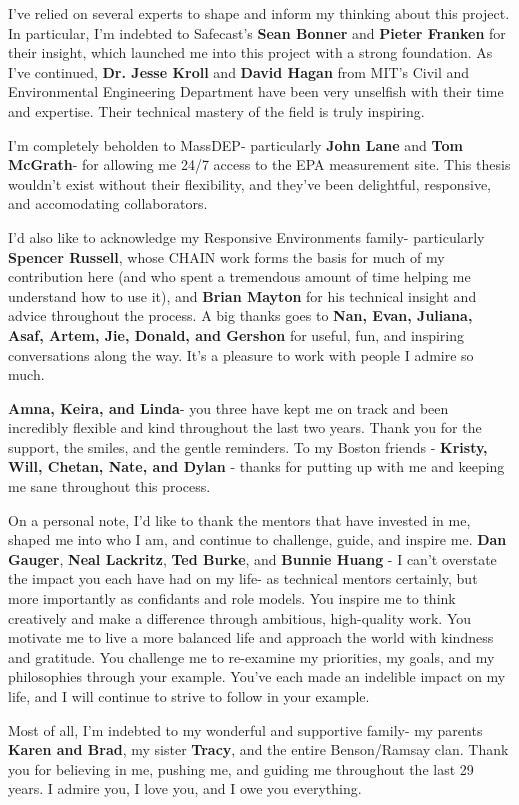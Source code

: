 I've relied on several experts to shape and inform my thinking about this project.  In particular, I'm indebted to Safecast's \textbf{Sean Bonner} and \textbf{Pieter Franken} for their insight, which launched me into this project with a strong foundation.  As I've continued, \textbf{Dr. Jesse Kroll} and \textbf{David Hagan} from MIT's Civil and Environmental Engineering Department have been very unselfish with their time and expertise.  Their technical mastery of the field is truly inspiring.     

I'm completely beholden to MassDEP- particularly \textbf{John Lane} and \textbf{Tom McGrath}- for allowing me 24/7 access to the EPA measurement site.  This thesis wouldn't exist without their flexibility, and they've been delightful, responsive, and accomodating collaborators. 

I'd also like to acknowledge my Responsive Environments family- particularly \textbf{Spencer Russell}, whose CHAIN work forms the basis for much of my contribution here (and who spent a tremendous amount of time helping me understand how to use it), and \textbf{Brian Mayton} for his technical insight and advice throughout the process.  A big thanks goes to \textbf{Nan, Evan, Juliana, Asaf, Artem, Jie, Donald, and Gershon} for useful, fun, and inspiring conversations along the way.  It's a pleasure to work with people I admire so much.

\textbf{Amna, Keira, and Linda}- you three have kept me on track and been incredibly flexible and kind throughout the last two years.  Thank you for the support, the smiles, and the gentle reminders.  To my Boston friends - \textbf{Kristy, Will, Chetan, Nate, and Dylan} - thanks for putting up with me and keeping me sane throughout this process.  

On a personal note, I'd like to thank the mentors that have invested in me, shaped me into who I am, and continue to challenge, guide, and inspire me.  \textbf{Dan Gauger}, \textbf{Neal Lackritz}, \textbf{Ted Burke}, and \textbf{Bunnie Huang} - I can't overstate the impact you each have had on my life- as technical mentors certainly, but more importantly as confidants and role models.  You inspire me to think creatively and make a difference through ambitious, high-quality work.  You motivate me to live a more balanced life and approach the world with kindness and gratitude.  You challenge me to re-examine my priorities, my goals, and my philosophies through your example.  You've each made an indelible impact on my life, and I will continue to strive to follow in your example.   

Most of all, I'm indebted to my wonderful and supportive family- my parents \textbf{Karen and Brad}, my sister \textbf{Tracy}, and the entire Benson/Ramsay clan.  Thank you for believing in me, pushing me, and guiding me throughout the last 29 years.  I admire you, I love you, and I owe you everything.



\restoregeometry

